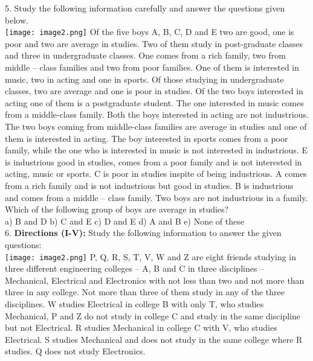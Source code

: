 \documentclass[
]{article}
\begin{document}
5. Study the following information carefully and answer the questions given below.\\
\texttt{[image: image2.png]}
Of the five boys A, B, C, D and E two are good, one is poor and two are average in studies.
Two of them study in post-graduate classes and three in undergraduate classes. One comes
from a rich family, two from middle – class families and two from poor families. One of
them is interested in music, two in acting and one in sports. Of those studying in
undergraduate classes, two are average and one is poor in studies. Of the two boys
interested in acting one of them is a postgraduate student. The one interested in music
comes from a middle-class family. Both the boys interested in acting are not industrious.
The two boys coming from middle-class families are average in studies and one of them is
interested in acting. The boy interested in sports comes from a poor family, while the one
who is interested in music is not interested in industrious. E is industrious good in studies,
comes from a poor family and is not interested in acting, music or sports. C is poor in
studies inspite of being industrious. A comes from a rich family and is not industrious but
good in studies. B is industrious and comes from a middle – class family. Two boys are not
industrious in a family.\\
Which of the following group of boys are average in studies?\\
a) B and D \hspace{2mm}b) C and E \hspace{2mm}c) D and E \hspace{2mm}d) A and B \hspace{2mm}e) None of these\\

6. \textbf{Directions (I-V):} Study the following information to answer the given questions:\\
\texttt{[image: image2.png]}
P, Q, R, S, T, V, W and Z are eight friends studying in three different engineering colleges –
A, B and C in three disciplines – Mechanical, Electrical and Electronics with not less than
two and not more than three in any college. Not more than three of them study in any of the
three disciplines. W studies Electrical in college B with only T, who studies Mechanical, P
and Z do not study in college C and study in the same discipline but not Electrical. R studies
Mechanical in college C with V, who studies Electrical. S studies Mechanical and does not
study in the same college where R studies. Q does not study Electronics.\\
\end{document}
